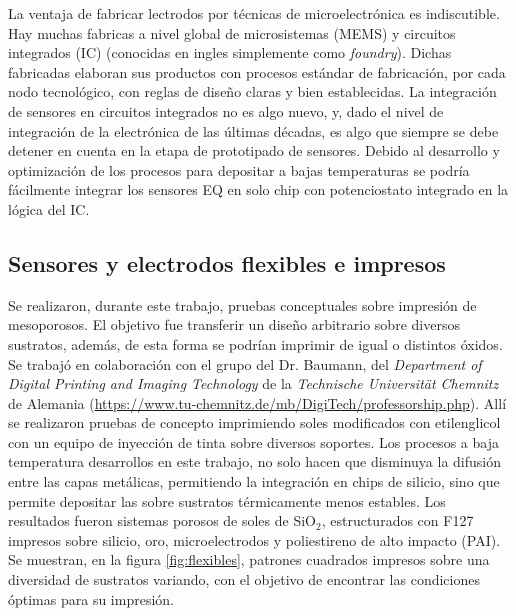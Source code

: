 {	  La ventaja de fabricar lectrodos por técnicas de microelectrónica es indiscutible. Hay muchas fabricas a nivel global  de microsistemas (MEMS) y circuitos integrados (IC) (conocidas en ingles simplemente como \textit{foundry}). Dichas fabricadas elaboran sus productos con procesos estándar de fabricación, por cada nodo tecnológico, con reglas de diseño claras y bien establecidas. La integración de sensores en circuitos integrados no es algo nuevo, y, dado el nivel de integración de la electrónica de las últimas décadas, es algo que siempre se debe detener en cuenta en la etapa de prototipado de sensores.\cite{Wang2012,Liu1993,Novell2012,Yu2013,Sarkar2014} Debido al desarrollo y optimización de los procesos para depositar \pdm\space a bajas temperaturas se podría fácilmente integrar los sensores EQ en solo chip con potenciostato integrado en la lógica del IC.
 	
 	\subsection{Sensores y electrodos flexibles e impresos}

 	  Se realizaron, durante este trabajo, pruebas conceptuales sobre impresión de mesoporosos. El objetivo fue transferir un diseño arbitrario sobre diversos sustratos, además, de esta forma se podrían imprimir \pdm\space de igual o distintos óxidos. Se trabajó en colaboración con el grupo del Dr. Baumann, del \textit{Department of Digital Printing and Imaging Technology} de la \textit{Technische Universität Chemnitz} de Alemania (\url{https://www.tu-chemnitz.de/mb/DigiTech/professorship.php}). Allí se realizaron pruebas de concepto imprimiendo soles modificados con etilenglicol con un equipo de inyección de tinta sobre diversos soportes. Los procesos a baja temperatura desarrollos en este trabajo, no solo hacen que disminuya la difusión entre las capas metálicas, permitiendo la integración en chips de silicio, sino que permite depositar las \pdm\space sobre sustratos térmicamente menos estables. Los resultados fueron sistemas porosos de soles de SiO$_2$, estructurados con F127 impresos sobre silicio, oro, microelectrodos y poliestireno de alto impacto (PAI). Se muestran, en la figura \ref{fig:flexibles}, patrones cuadrados impresos sobre una diversidad de sustratos variando, con el objetivo de encontrar las condiciones óptimas para su impresión.

}

